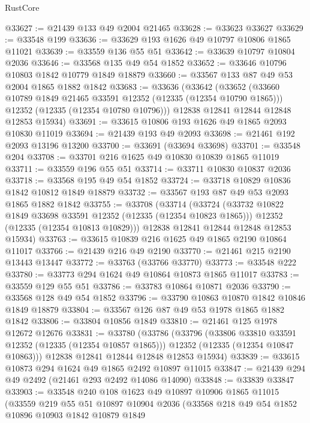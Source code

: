 \begin{lexlean}{RustCore}
\begin{coremodule}
@33627 := @21439 @133 @49 @2004 @21465
@33628 := @33623 @33627
@33629 := @33548 @199
@33636 := @33629 @193 @1626 @49 @10797 @10806 @1865 @11021
@33639 := @33559 @136 @55 @51
@33642 := @33639 @10797 @10804 @2036
@33646 := @33568 @135 @49 @54 @1852
@33652 := @33646 @10796 @10803 @1842 @10779 @1849 @18879
@33660 := @33567 @133 @87 @49 @53 @2004 @1865 @1882 @1842
@33683 := @33636
    (@33642
      (@33652
        (@33660 @10789 @1849 @21465 @33591 @12352 (@12335 (@12354 @10790 @1865)))
        @12352
        (@12335 (@12354 @10780 @10796)))
      @12838
      @12841
      @12844
      @12848
      @12853
      @15934)
@33691 := @33615 @10806 @193 @1626 @49 @1865 @2093 @10830 @11019
@33694 := @21439 @193 @49 @2093
@33698 := @21461 @192 @2093 @13196 @13200
@33700 := @33691 (@33694 @33698)
@33701 := @33548 @204
@33708 := @33701 @216 @1625 @49 @10830 @10839 @1865 @11019
@33711 := @33559 @196 @55 @51
@33714 := @33711 @10830 @10837 @2036
@33718 := @33568 @195 @49 @54 @1852
@33724 := @33718 @10829 @10836 @1842 @10812 @1849 @18879
@33732 := @33567 @193 @87 @49 @53 @2093 @1865 @1882 @1842
@33755 := @33708
    (@33714
      (@33724
        (@33732 @10822 @1849 @33698 @33591 @12352 (@12335 (@12354 @10823 @1865)))
        @12352
        (@12335 (@12354 @10813 @10829)))
      @12838
      @12841
      @12844
      @12848
      @12853
      @15934)
@33763 := @33615 @10839 @216 @1625 @49 @1865 @2190 @10864 @11017
@33766 := @21439 @216 @49 @2190
@33770 := @21461 @215 @2190 @13443 @13447
@33772 := @33763 (@33766 @33770)
@33773 := @33548 @222
@33780 := @33773 @294 @1624 @49 @10864 @10873 @1865 @11017
@33783 := @33559 @129 @55 @51
@33786 := @33783 @10864 @10871 @2036
@33790 := @33568 @128 @49 @54 @1852
@33796 := @33790 @10863 @10870 @1842 @10846 @1849 @18879
@33804 := @33567 @126 @87 @49 @53 @1978 @1865 @1882 @1842
@33806 := @33804 @10856 @1849
@33810 := @21461 @125 @1978 @12672 @12676
@33831 := @33780
    (@33786
      (@33796
        (@33806 @33810 @33591 @12352 (@12335 (@12354 @10857 @1865)))
        @12352
        (@12335 (@12354 @10847 @10863)))
      @12838
      @12841
      @12844
      @12848
      @12853
      @15934)
@33839 := @33615 @10873 @294 @1624 @49 @1865 @2492 @10897 @11015
@33847 := @21439 @294 @49 @2492 (@21461 @293 @2492 @14086 @14090)
@33848 := @33839 @33847
@33903 := @33548
    @240
    @108
    @1623
    @49
    @10897
    @10906
    @1865
    @11015
    (@33559
      @219
      @55
      @51
      @10897
      @10904
      @2036
      (@33568
        @218
        @49
        @54
        @1852
        @10896
        @10903
        @1842
        @10879
        @1849

\end{coremodule}
\end{lexlean}
